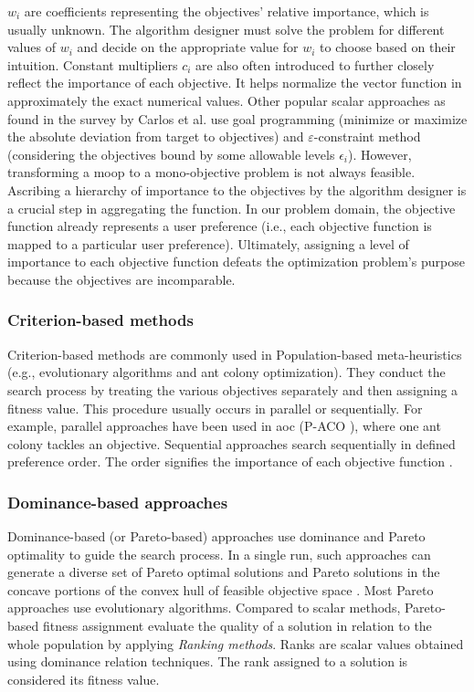 $w_i$ are coefficients representing the objectives' relative importance, which is usually unknown. The algorithm designer must solve the problem for different values of $w_i$ and decide on the appropriate value for $w_i$ to choose based on their intuition. Constant multipliers $c_i$ are also often introduced to further closely reflect the importance of each objective. It helps normalize the vector function in approximately the exact numerical values.
Other popular scalar approaches as found in the survey by Carlos et al. \parencite{CoelloCoello1999ATechniquesc} use goal programming (minimize or maximize the absolute deviation from target to objectives) and $\varepsilon$-constraint method (considering the objectives bound by some allowable levels $\epsilon_i$). However, transforming a \gls{moop} to a mono-objective problem is not always feasible. Ascribing a hierarchy of importance to the objectives by the algorithm designer is a crucial step in aggregating the function. In our problem domain, the objective function already represents a user preference (i.e., each objective function is mapped to a particular user preference). Ultimately, assigning a level of importance to each objective function defeats the optimization problem's purpose because the objectives are incomparable.

\subsubsection{Criterion-based methods}
Criterion-based methods are commonly used in Population-based meta-heuristics (e.g., evolutionary algorithms and ant colony optimization). They conduct the search process by treating the various objectives separately and then assigning a fitness value. This procedure usually occurs in parallel or sequentially. For example, parallel approaches have been used in \gls{aoc} (P-ACO \parencite{Doerner2004ParetoSelection}), where one ant colony tackles an objective. Sequential approaches search sequentially in defined preference order. The order signifies the importance of each objective function \parencite{Fishburn1974ExceptionalSurvey}.

\subsubsection{Dominance-based approaches}
Dominance-based (or Pareto-based) approaches use dominance and Pareto optimality to guide the search process. In a single run, such approaches can generate a diverse set of Pareto optimal solutions and Pareto solutions in the concave portions of the convex hull of feasible objective space \parencite{Talbi2009Metaheuristics:Implementation}. Most Pareto approaches use evolutionary algorithms. Compared to scalar methods, Pareto-based fitness assignment evaluate the quality of a solution in relation to the whole population by applying \textit{ Ranking methods}. Ranks are scalar values obtained using dominance relation techniques. The rank assigned to a solution is considered its fitness value.


